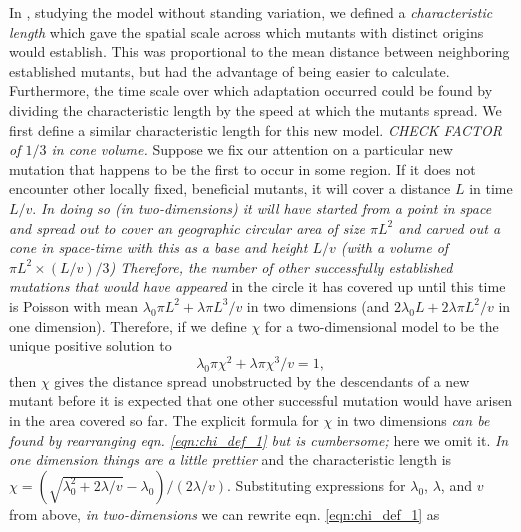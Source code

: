 \documentclass{article}
\newcommand{\gc}[1]{{\it\color{blue} #1} }
\begin{document}
In \citet{ralphcoop2010}, studying the model without standing variation,
we defined a {\em characteristic length} which gave the spatial scale across which mutants with distinct origins would establish.
This was proportional to the mean distance between neighboring established mutants,
but had the advantage of being easier to calculate.
Furthermore, the time scale over which adaptation occurred could be found by dividing the characteristic length 
by the speed at which the mutants spread.
We first define a similar characteristic length for this new model. %
\gc{CHECK FACTOR of $1/3$ in cone volume.}
Suppose we fix our attention on a particular new mutation that happens to be the first to occur in some region.
If it does not encounter other locally fixed, beneficial mutants,
it will cover a distance $L$ in time $L/v$. \gc{In doing so (in two-dimensions) it will have
started from a point in space and spread out to cover an geographic
circular area of size $\pi
L^2$ and carved out a cone in space-time with this as a base and
height $L/v$ (with a volume of $\pi L^2 \times (L/v)/3$)
Therefore, the number of other successfully established mutations that
would have appeared} in the circle it has covered up until this time is Poisson with mean
$\lambda_0 \pi L^2 + \lambda \pi L^3 /v$ in two dimensions
(and $2 \lambda_0 L + 2 \lambda \pi L^2 /v$ in one dimension).
Therefore, if we define $\chi$ for a two-dimensional model to be the unique positive solution to
\begin{equation} \label{eqn:chi_def_1}
    \lambda_0 \pi \chi^2 + \lambda \pi \chi^3 /v = 1,
\end{equation}
then $\chi$ gives the distance spread unobstructed by the descendants of a new mutant
before it is expected that one other successful mutation would have arisen in the area covered so far.
The explicit formula for $\chi$ in two dimensions \gc{can be found by
rearranging eqn. \eqref{eqn:chi_def_1} but is cumbersome;} here we omit
it. \gc{In one dimension things are a little prettier} and the characteristic length is $\chi = ( \sqrt{\lambda_0^2 + 2 \lambda/v} - \lambda_0 )/( 2 \lambda / v )$.
Substituting expressions for $\lambda_0$, $\lambda$, and $v$ from above,
\gc{in two-dimensions} we can rewrite eqn. \eqref{eqn:chi_def_1} as
\end{document}
